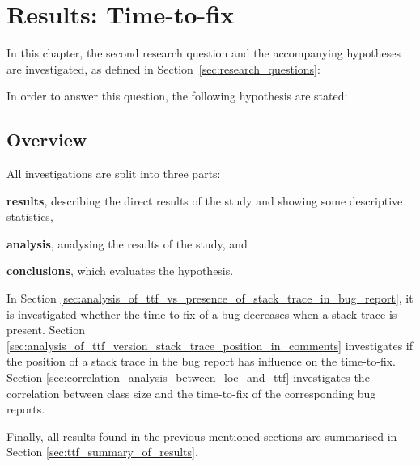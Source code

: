 
\chapter{Results: Time-to-fix} %
\label{cha:results_time_to_fix}

In this chapter, the second research question and the accompanying hypotheses are investigated, as defined in Section~\ref{sec:research_questions}:

\vspace{\baselineskip}
\questionb{}

In order to answer this question, the following hypothesis are stated:

\vspace{\baselineskip}
\hypba{}

\vspace{\baselineskip}
\hypbb{}

\vspace{\baselineskip}
\hypbc{}

\section{Overview} %
All investigations are split into three parts: 
\begin{inparaenum}[(1)]
\item \textbf{results}, describing the direct results of the study and showing some descriptive statistics,
\item \textbf{analysis}, analysing the results of the study, and
\item \textbf{conclusions}, which evaluates the hypothesis.
\end{inparaenum}

In Section \ref{sec:analysis_of_ttf_vs_presence_of_stack_trace_in_bug_report}, it is investigated whether the time-to-fix of a bug decreases when a stack trace is present. Section \ref{sec:analysis_of_ttf_version_stack_trace_position_in_comments} investigates if the position of a stack trace in the bug report has influence on the time-to-fix. Section \ref{sec:correlation_analysis_between_loc_and_ttf} investigates the correlation between class size and the time-to-fix of the corresponding bug reports.

Finally, all results found in the previous mentioned sections are summarised in Section \ref{sec:ttf_summary_of_results}.


